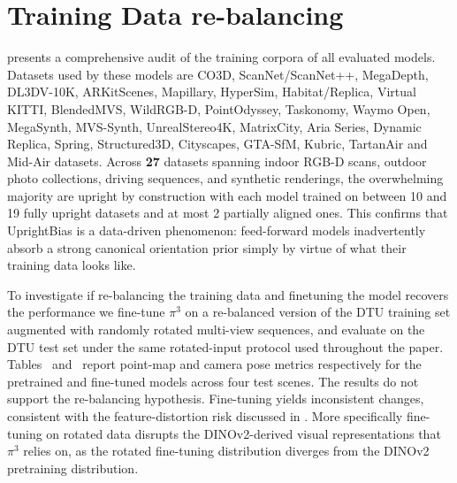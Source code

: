 \section{Training Data re-balancing}
\label{sec:training_data_rebalancing}

 presents a comprehensive audit of 
the training corpora of all evaluated models. Datasets used by these models are CO3D\citep{co3dv1,reizenstein21co3dv2}, ScanNet/ScanNet++\citep{dai2017scannet, yeshwanthliu2023scannetpp}, MegaDepth\citep{MegaDepthLi18}, DL3DV-10K\citep{ling2024dl3dv}, ARKitScenes\citep{baruch2021arkitscenes}, Mapillary\citep{MapillaryPlanetScaleDepth}, HyperSim\citep{roberts:2021Hypersim}, Habitat/Replica\citep{ramakrishnan2021hm3dhabitat}, Virtual KITTI\citep{gaidon2016virtualkitti2}, BlendedMVS\citep{yao2020blendedmvs}, WildRGB-D\citep{xia2024wildrgbd}, PointOdyssey\citep{zheng2023pointoddessey}, Taskonomy\citep{taskonomy2018}, Waymo Open\cite{Sun_2020_CVPRwaymoopen}, MegaSynth\cite{jiang2024megasynth}, MVS-Synth\citep{DeepMVSSynth}, UnrealStereo4K\citep{zhang2018unrealstereo}, MatrixCity\citep{li2023matrixcity}, Aria Series\citep{pan2023ariadigitaltwin, banerjee2024ariaHOT3D, ma2024arianymeriadataset, lv2024ariaeverydayactivities}, Dynamic Replica\citep{karaev2023dynamicreplicastereo}, Spring\citep{mehl2023springdataset}, Structured3D\citep{Structured3Ddataset}, Cityscapes\cite{cordts2016cityscapes}, GTA-SfM\citep{cao2020longgtasfm}, Kubric\citep{greff2021kubricdataset}, TartanAir\citep{tartanair2020iros} and Mid-Air \citep{Fonder2019MidAir} datasets. Across \textbf{27} datasets spanning indoor RGB-D scans, outdoor photo collections, driving sequences, and synthetic renderings, the overwhelming majority are upright by construction with each model trained on between 10 and 19 fully upright datasets and at most 2 partially aligned ones. This confirms that UprightBias is a data-driven phenomenon: feed-forward models inadvertently absorb a strong canonical orientation prior simply by virtue of what their training data looks like.

To investigate if re-balancing the training data and finetuning the model recovers the performance we fine-tune $\pi^3$ on a re-balanced version of the DTU training set 
augmented with randomly rotated multi-view sequences, and evaluate 
on the DTU test set under the same rotated-input protocol used 
throughout the paper. Tables~ 
and~ report point-map and camera 
pose metrics respectively for the pretrained and fine-tuned models 
across four test scenes. The results do not support the re-balancing hypothesis. 
Fine-tuning yields inconsistent changes, consistent with the feature-distortion risk discussed in \citep{kumar2022finetuningchallenges, tang2020longchallenges, kang2019decouplingtrainingdata3}. More specifically fine-tuning on rotated data disrupts the DINOv2-derived visual representations that $\pi^3$ relies on, as the rotated fine-tuning distribution diverges from the DINOv2 pretraining distribution. 

